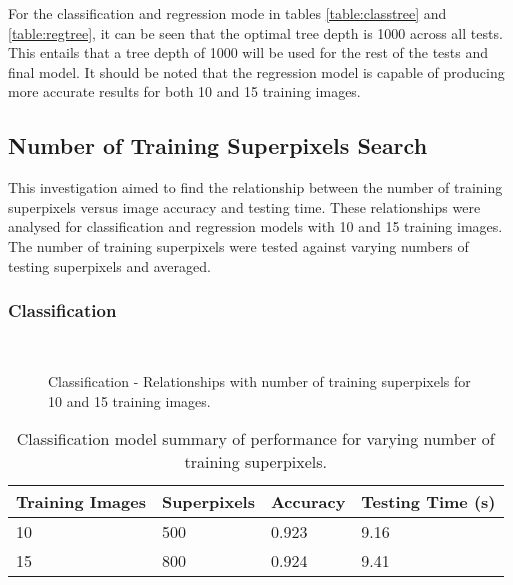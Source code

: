 For the classification and regression mode in tables \ref{table:classtree} and \ref{table:regtree}, it can be seen that the optimal tree depth is 1000 across all tests. This entails that a tree depth of 1000 will be used for the rest of the tests and final model. It should be noted that the regression model is capable of producing more accurate results for both 10 and 15 training images. 

\subsection{Number of Training Superpixels Search}
\label{res:trainpix}
This investigation aimed to find the relationship between the number of training superpixels versus image accuracy and testing time. These relationships were analysed for classification and regression models with 10 and 15 training images. The number of training superpixels were tested against varying numbers of testing superpixels and averaged. 

\subsubsection{Classification}
\begin{figure}[H]
    \centering
    \\
    \caption{Classification - Relationships with number of training superpixels for 10 and 15 training images.}%
    \label{class:trainpix}
\end{figure}

\begin{table}[H]
\centering
\caption{Classification model summary of performance for varying number of training superpixels.}

\begin{tabular}{|l|l|l|l|}
\hline
 \textbf{Training Images} &	\textbf{Superpixels} & \textbf{Accuracy} & \textbf{Testing Time (s)}\\
\hline
10 & 500 & 0.923 & 9.16\\
\hline				    	 			
15 & 800 & 0.924 & 9.41\\	
\hline		    	 
\end{tabular}
\label{table:classtrainpix}
\end{table}

